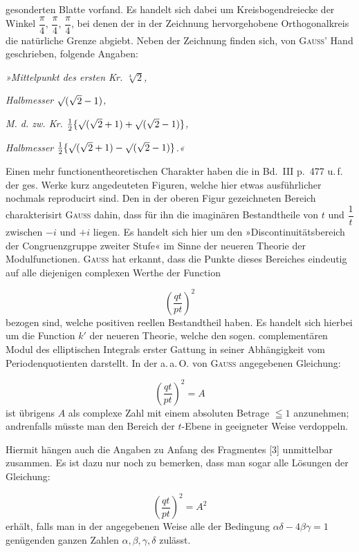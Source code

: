 \noindent gesonderten Blatte vorfand. Es handelt sich dabei um Kreisbogendreiecke der Winkel $\dfrac{\pi}{4}$, $\dfrac{\pi}{4}$, $\dfrac{\pi}{4}$, bei denen der in der Zeichnung hervorgehobene Orthogonalkreis die natürliche Grenze abgiebt. Neben der Zeichnung finden sich, von \textsc{Gauss}' Hand geschrieben, folgende Angaben:

\emph{»Mittelpunkt des ersten Kr. $\sqrt[4]{2}$,}

\emph{Halbmesser $\mathord{\surd}(\sqrt{2}-1)$,}

\emph{M. d. zw. Kr. $\frac12\{\mathord{\surd}(\sqrt2+1)+\mathord{\surd}(\sqrt2-1)\}$,}

\emph{Halbmesser $\frac12\{\mathord{\surd}(\sqrt2+1)-\mathord{\surd}(\sqrt2-1)\}$.«}

Einen mehr functionentheoretischen Charakter haben die in Bd.~III p.~477 u.\,f. der ges. Werke kurz angedeuteten Figuren, welche hier etwas ausführlicher nochmals reproducirt sind. Den in der oberen Figur gezeichneten Bereich charakterisirt \textsc{Gauss} dahin, dass für ihn die imaginären Bestandtheile von $t$ und $\dfrac1t$ zwischen $-i$ und $+i$ liegen. Es handelt sich hier um den »Discontinuitätsbereich der Congruenzgruppe zweiter Stufe« im Sinne der neueren Theorie der Modulfunctionen. \textsc{Gauss} hat erkannt, dass die Punkte dieses Bereiches eindeutig auf alle diejenigen complexen Werthe der Function

\begin{center}\resizebox{8.3cm}{!}{}\end{center}

\[
\left(\frac{qt}{pt}\right)^{2}
\]
bezogen sind, welche positiven reellen Bestandtheil haben. Es handelt sich hierbei um die Function $k'$ der neueren Theorie, welche den sogen. complementären Modul des elliptischen Integrals erster Gattung in seiner Abhängigkeit vom Periodenquotienten darstellt. In der a.\,a.\,O. von \textsc{Gauss} angegebenen Gleichung:

\[
\left(\frac{qt}{pt}\right)^{2} = A
\]
ist übrigens $A$ als complexe Zahl mit einem absoluten Betrage $\leqq 1$ an\-zunehmen; andrenfalls müsste man den Bereich der $t$-Ebene in geeigneter Weise verdoppeln.

Hiermit hängen auch die Angaben zu Anfang des Fragmentes [3] unmittelbar zusammen. Es ist dazu nur noch zu bemerken, dass man sogar alle Lösungen der Gleichung:

\[
\left(\frac{qt}{pt}\right)^{2} = A^{2}
\]
erhält, falls man in der angegebenen Weise alle der Bedingung $\alpha\delta - 4\beta\gamma = 1$ genügenden ganzen Zahlen $\alpha, \beta, \gamma, \delta$ zulässt.

